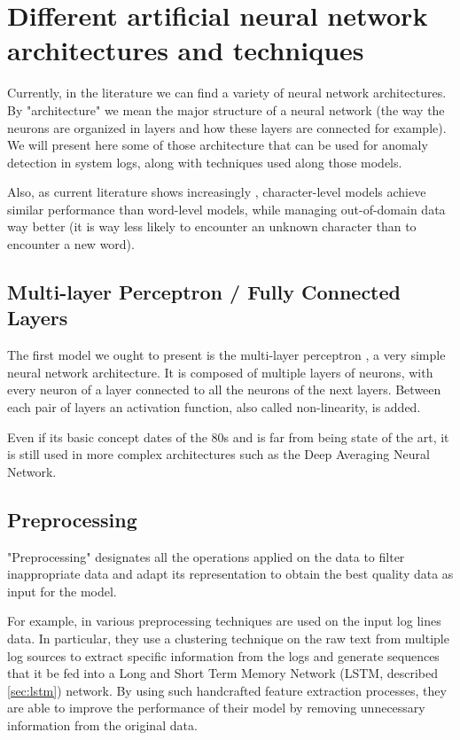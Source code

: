 \chapter{Different artificial neural network architectures and techniques}

Currently, in the literature we can find a variety of neural network architectures. By "architecture" we mean the major structure of a neural network (the way the neurons are organized in layers and how these layers are connected for example). We will present here some of those architecture that can be used for anomaly detection in system logs, along with techniques used along those models.

Also, as current literature shows increasingly \cite{rnn_attention_lanl}, character-level models achieve similar performance than word-level models, while managing out-of-domain data way better (it is way less likely to encounter an unknown character than to encounter a new word).

\section{Multi-layer Perceptron / Fully Connected Layers}
The first model we ought to present is the multi-layer perceptron \cite{deep_learning_book}, a very simple neural network architecture.
It is composed of multiple layers of neurons, with every neuron of a layer connected to all the neurons of the next layers. Between each pair of layers an activation function, also called non-linearity, is added.

Even if its basic concept dates of the 80s \cite{mlp} and is far from being state of the art, it is still used in more complex architectures such as the Deep Averaging Neural Network.

\section{Preprocessing}
"Preprocessing" designates all the operations applied on the data to filter inappropriate data and adapt its representation to obtain the best quality data as input for the model.

For example, in \cite{lstm_cluster} various preprocessing techniques are used on the input log lines data. In particular, they use a clustering technique on the raw text from multiple log sources to extract specific information from the logs and generate sequences that it be fed into a Long and Short Term Memory Network (LSTM, described \autoref{sec:lstm}) network. By using such handcrafted feature extraction processes, they are able to improve the performance of their model by removing unnecessary information from the original data.

